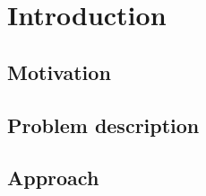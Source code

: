 \chapter{Introduction}


\section{Motivation}



\section{Problem description}



\section{Approach}

